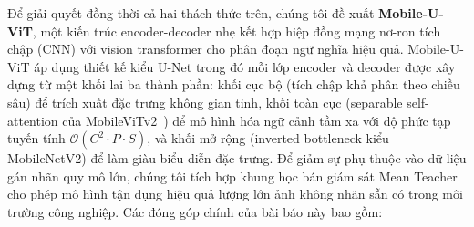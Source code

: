 \documentclass[conference]{IEEEtran}
\begin{document}
Để giải quyết đồng thời cả hai thách thức trên, chúng tôi đề xuất \textbf{Mobile-U-ViT}, một kiến trúc encoder-decoder nhẹ kết hợp hiệp đồng mạng nơ-ron tích chập (CNN) với vision transformer cho phân đoạn ngữ nghĩa hiệu quả. Mobile-U-ViT áp dụng thiết kế kiểu U-Net trong đó mỗi lớp encoder và decoder được xây dựng từ một khối lai ba thành phần: khối cục bộ (tích chập khả phân theo chiều sâu) để trích xuất đặc trưng không gian tinh, khối toàn cục (separable self-attention của MobileViTv2~\cite{b3}) để mô hình hóa ngữ cảnh tầm xa với độ phức tạp tuyến tính $\mathcal{O}(C^2 \cdot P \cdot S)$, và khối mở rộng (inverted bottleneck kiểu MobileNetV2) để làm giàu biểu diễn đặc trưng. Để giảm sự phụ thuộc vào dữ liệu gán nhãn quy mô lớn, chúng tôi tích hợp khung học bán giám sát Mean Teacher~\cite{b4} cho phép mô hình tận dụng hiệu quả lượng lớn ảnh không nhãn sẵn có trong môi trường công nghiệp. Các đóng góp chính của bài báo này bao gồm:
\end{document}
